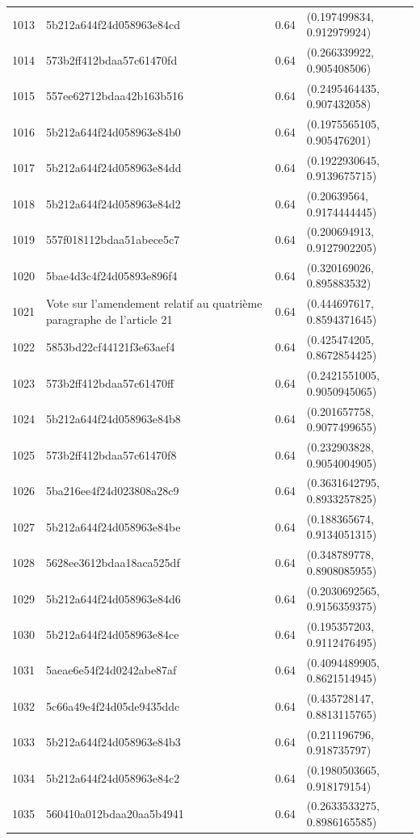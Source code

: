 \begin{table}[ht]
\begin{tabular}{rlrl}
  1013 & 5b212a644f24d058963e84cd & 0.64 & (0.197499834, 0.912979924) \\ 
  1014 & 573b2ff412bdaa57c61470fd & 0.64 & (0.266339922, 0.905408506) \\ 
  1015 & 557ee62712bdaa42b163b516 & 0.64 & (0.2495464435, 0.907432058) \\ 
  1016 & 5b212a644f24d058963e84b0 & 0.64 & (0.1975565105, 0.905476201) \\ 
  1017 & 5b212a644f24d058963e84dd & 0.64 & (0.1922930645, 0.9139675715) \\ 
  1018 & 5b212a644f24d058963e84d2 & 0.64 & (0.20639564, 0.9174444445) \\ 
  1019 & 557f018112bdaa51abece5c7 & 0.64 & (0.200694913, 0.9127902205) \\ 
  1020 & 5bae4d3c4f24d05893e896f4 & 0.64 & (0.320169026, 0.895883532) \\ 
  1021 & Vote sur l'amendement relatif au quatrième paragraphe de l'article 21 & 0.64 & (0.444697617, 0.8594371645) \\ 
  1022 & 5853bd22cf44121f3e63aef4 & 0.64 & (0.425474205, 0.8672854425) \\ 
  1023 & 573b2ff412bdaa57c61470ff & 0.64 & (0.2421551005, 0.9050945065) \\ 
  1024 & 5b212a644f24d058963e84b8 & 0.64 & (0.201657758, 0.9077499655) \\ 
  1025 & 573b2ff412bdaa57c61470f8 & 0.64 & (0.232903828, 0.9054004905) \\ 
  1026 & 5ba216ee4f24d023808a28c9 & 0.64 & (0.3631642795, 0.8933257825) \\ 
  1027 & 5b212a644f24d058963e84be & 0.64 & (0.188365674, 0.9134051315) \\ 
  1028 & 5628ee3612bdaa18aca525df & 0.64 & (0.348789778, 0.8908085955) \\ 
  1029 & 5b212a644f24d058963e84d6 & 0.64 & (0.2030692565, 0.9156359375) \\ 
  1030 & 5b212a644f24d058963e84ce & 0.64 & (0.195357203, 0.9112476495) \\ 
  1031 & 5aeae6e54f24d0242abe87af & 0.64 & (0.4094489905, 0.8621514945) \\ 
  1032 & 5c66a49e4f24d05de9435ddc & 0.64 & (0.435728147, 0.8813115765) \\ 
  1033 & 5b212a644f24d058963e84b3 & 0.64 & (0.211196796, 0.918735797) \\ 
  1034 & 5b212a644f24d058963e84c2 & 0.64 & (0.1980503665, 0.918179154) \\ 
  1035 & 560410a012bdaa20aa5b4941 & 0.64 & (0.2633533275, 0.8986165585) \\ 

\end{tabular}
\end{table}
